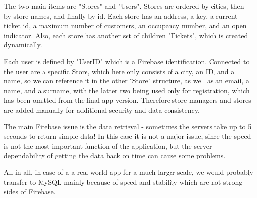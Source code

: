 The two main items are "Stores" and "Users". Stores are ordered by cities, then by store names, and finally by id. Each store has an address, a key, a current ticket id, a maximum number of customers, an occupancy number, and an open indicator. Also, each store has another set of children "Tickets", which is created dynamically. \newline

Each user is defined by "UserID" which is a Firebase identification. Connected to the user are a specific Store, which here only consists of a city, an ID, and a name, so we can reference it in the other "Store" structure, as well as an email, a name, and a surname, with the latter two being used only for registration, which has been omitted from the final app version. Therefore store managers and stores are added manually for additional security and data consistency. \newline

The main Firebase issue is the data retrieval - sometimes the servers take up to 5 seconds to return simple data! In this case it is not a major issue, since the speed is not the most important function of the application, but the server dependability of getting the data back on time can cause some problems. \newline

All in all, in case of a a real-world app for a much larger scale, we would probably transfer to MySQL mainly because of speed and stability which are not strong sides of Firebase. \newline
